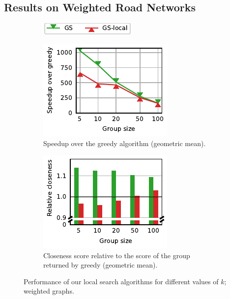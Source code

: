 \subsection{Results on Weighted Road Networks}
%
\begin{figure}[tb]
\centering
\begin{subfigure}[t]{\textwidth}
\centering
\includegraphics{./sources/plots/local-search-heu/legend-weighted.pdf}
\end{subfigure}
\centering
\begin{subfigure}[t]{.4\textwidth}
\centering
\includegraphics{./sources/plots/local-search-heu/speedups-weighted.pdf}
\caption{Speedup over the greedy algorithm (geometric mean).}
\label{fig:lsh-gc-speedup-weighted}
\end{subfigure}%
\hfill
\begin{subfigure}[t]{.4\textwidth}
\centering
\includegraphics{./sources/plots/local-search-heu/quality-weighted.pdf}
\caption{Closeness score relative to the score of the group returned by greedy (geometric mean).}
\label{fig:lsh-gc-quality-weighted}
\end{subfigure}
\caption{Performance of our local search algorithms for different values of $k$;
weighted graphs.}
\label{fig:lsh-gc-perf-weighted}
\end{figure}

